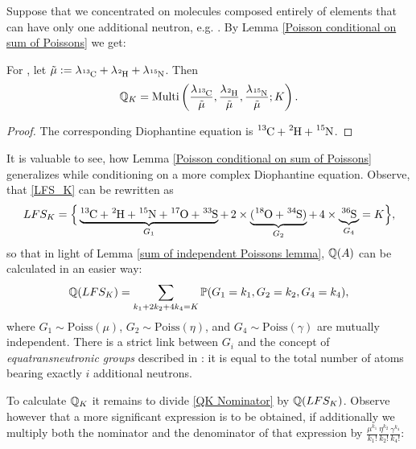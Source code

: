 Suppose that we concentrated on molecules composed entirely of elements that can have only one additional neutron, e.g. \smallMolecule. By Lemma \ref{Poisson conditional on sum of Poissons} we get:

\begin{result}\label{Multinomial Result}
 	For \smallMolecule, let $\tilde{\mu} := \lambda_\cem{^{13}C} + \lambda_\cem{^{2}H} + \lambda_\cem{^{15}N}$. Then
 	$$\QK = \mathrm{Multi}\left(
 		\frac{\lambda_\cem{^{13}C}}{\tilde{\mu}}, 
 		\frac{\lambda_\cem{^{2}H}}{\tilde{\mu}}, 
 		\frac{\lambda_\cem{^{15}N}}{\tilde{\mu}}; K \right).$$
\end{result}

\begin{proof}
	The corresponding Diophantine equation is $\cem{^{13}C} + \cem{^2H} + \cem{^{15}N}$.
\end{proof}

It is valuable to see, how Lemma \ref{Poisson conditional on sum of Poissons} generalizes while conditioning on a more complex Diophantine equation. Observe, that \eqref{LFS_K} can be rewritten as 
\begin{equation*}
	LFS_K = \Big\{ \underbrace{\cem{^{13}C} + \cem{^2H} + \cem{^{15}N} + \cem{^{17}O} + \cem{^{33}S}}_{ G_1 } + \,2 \times \underbrace{( \cem{^{18}O} + \cem{^{34}S} )}_{ G_2 } + \,4 \times \underbrace{\cem{^{36}S}}_{ G_4 } = K \Big\},	
\end{equation*}
so that in light of Lemma \ref{sum of independent Poissons lemma}, $\mathbb{Q}(A)$ can be calculated in an easier way: 
$$\mathbb{Q}( LFS_K ) = \sum_{k_1 + 2 k_2 + 4 k_4 = K} \mathbb{P}( G_1 = k_1, G_2 = k_2, G_4 = k_4 ),$$
where $G_1 \sim \mathrm{Poiss}( \mu )$, $G_2 \sim \mathrm{Poiss}( \eta )$, and $G_4 \sim \mathrm{Poiss}( \gamma )$ are mutually independent. There is a strict link between $G_i$ and the concept of {\it equatransneutronic groups} described in \cite{Olson2009Calculations}: it is equal to the total number of atoms bearing exactly $i$ additional neutrons.  

To calculate $\mathbb{Q}_K$ it remains to divide \eqref{QK Nominator} by $\mathbb{Q}( LFS_K )$. Observe however that a more significant expression is to be obtained, if additionally we multiply both the nominator and the denominator of that expression by $\frac{\mu^{k_1}}{k_1 !} \frac{\eta^{k_2}}{k_2 !} \frac{\gamma^{k_4}}{k_4 !}$:


